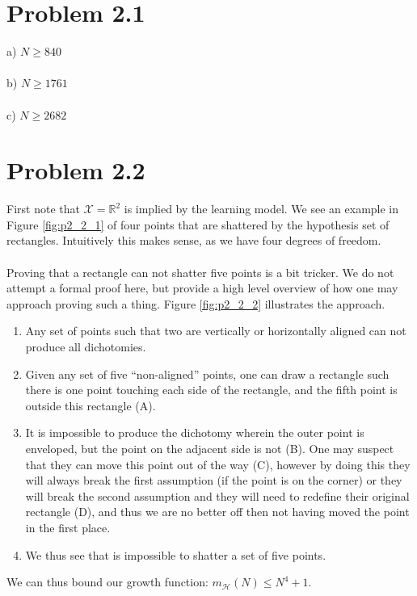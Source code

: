 \documentclass[11pt,letterpaper]{article}
\begin{document}
\section*{Problem 2.1}
a) $N \ge 840$
\\\\
b) $N \ge 1761$
\\\\
c) $N \ge 2682$

\section*{Problem 2.2}
First note that $\mathcal{X} = \mathbb{R}^2$ is implied by the learning model.  We see an example in Figure \ref{fig:p2_2_1} of four points that are shattered by the hypothesis set of rectangles.  Intuitively this makes sense, as we have four degrees of freedom.
\\\\
Proving that a rectangle can not shatter five points is a bit tricker.  We do not attempt a formal proof here, but provide a high level overview of how one may approach proving such a thing.  Figure \ref{fig:p2_2_2} illustrates the approach.

\begin{enumerate}
    \item Any set of points such that two are vertically or horizontally aligned can not produce all dichotomies.
    \item Given any set of five ``non-aligned'' points, one can draw a rectangle such there is one point touching each side of the rectangle, and the fifth point is outside this rectangle (A).
    \item It is impossible to produce the dichotomy wherein the outer point is enveloped, but the point on the adjacent side is not (B).  One may suspect that they can move this point out of the way (C), however by doing this they will always break the first assumption (if the point is on the corner) or they will break the second assumption and they will need to redefine their original rectangle (D), and thus we are no better off then not having moved the point in the first place.
    \item We thus see that is impossible to shatter a set of five points.
\end{enumerate}

We can thus bound our growth function: $m_\mathcal{H}(N) \le N^4 + 1$.
\end{document}
